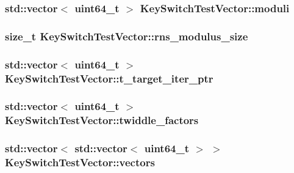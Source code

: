 \hypertarget{structKeySwitchTestVector_a093fb1d7c028277e953c73e14c4bdc38}{
\subsubsection[{moduli}]{\setlength{\rightskip}{0pt plus 5cm}std\-::vector$<$ uint64\-\_\-t $>$ Key\-Switch\-Test\-Vector\-::moduli}}\label{structKeySwitchTestVector_a093fb1d7c028277e953c73e14c4bdc38}
\hypertarget{structKeySwitchTestVector_a700faac161b8de302d05e4cdb24080b6}{
\subsubsection[{rns\-\_\-modulus\-\_\-size}]{\setlength{\rightskip}{0pt plus 5cm}size\-\_\-t Key\-Switch\-Test\-Vector\-::rns\-\_\-modulus\-\_\-size}}\label{structKeySwitchTestVector_a700faac161b8de302d05e4cdb24080b6}
\hypertarget{structKeySwitchTestVector_a87c4ef64d069c11709451f4fe7b4a5fd}{
\subsubsection[{t\-\_\-target\-\_\-iter\-\_\-ptr}]{\setlength{\rightskip}{0pt plus 5cm}std\-::vector$<$ uint64\-\_\-t $>$ Key\-Switch\-Test\-Vector\-::t\-\_\-target\-\_\-iter\-\_\-ptr}}\label{structKeySwitchTestVector_a87c4ef64d069c11709451f4fe7b4a5fd}
\hypertarget{structKeySwitchTestVector_a3299b1bfac2b08cfa386236a8e4b2c63}{
\subsubsection[{twiddle\-\_\-factors}]{\setlength{\rightskip}{0pt plus 5cm}std\-::vector$<$ uint64\-\_\-t $>$ Key\-Switch\-Test\-Vector\-::twiddle\-\_\-factors}}\label{structKeySwitchTestVector_a3299b1bfac2b08cfa386236a8e4b2c63}
\hypertarget{structKeySwitchTestVector_a00c0158e4d33300c0d34e9ca2be66a51}{
\subsubsection[{vectors}]{\setlength{\rightskip}{0pt plus 5cm}std\-::vector$<$ std\-::vector$<$ uint64\-\_\-t $>$ $>$ Key\-Switch\-Test\-Vector\-::vectors}}\label{structKeySwitchTestVector_a00c0158e4d33300c0d34e9ca2be66a51}


